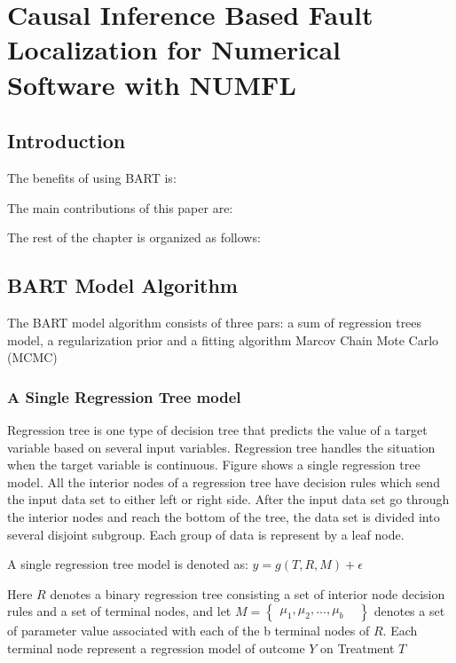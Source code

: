 \chapter{Causal Inference Based Fault Localization for Numerical Software with NUMFL}\label{chap:NUMFL}


\section{Introduction}\label{introduction}
\vspace{-2pt}

The benefits of using BART is:


The main contributions of this paper are:

The rest of the chapter is organized as follows: 

\section{BART Model Algorithm}\label{background}%
The BART model algorithm consists of three pars: a sum of regression trees model, a regularization prior and a fitting algorithm Marcov Chain Mote Carlo (MCMC) 
\subsection{A Single Regression Tree model}\label{IIIA}
Regression tree is one type of decision tree that predicts the value of a target variable based on several input variables. Regression tree handles the situation when the target variable is continuous. Figure{} shows a single regression tree model. All the interior nodes of a regression tree have decision rules which send the input data set to either left or right side. After the input data set go through the interior nodes and reach the bottom of the tree, the data set is divided into several disjoint subgroup. Each group of data is represent by a leaf node. 

A single regression tree model is denoted as:
$
y=g(T, R, M)+\epsilon
$

Here $R$ denotes a binary regression tree consisting a set of interior node decision rules and a set of terminal nodes, and let $M=
\begin{Bmatrix}
 \mu _1, \mu _2, . . ., \mu _b   & 
\end{Bmatrix}$
denotes a set of parameter value associated with each of the b terminal nodes of $R$. Each terminal node represent a regression model of outcome $Y$ on Treatment $T$


